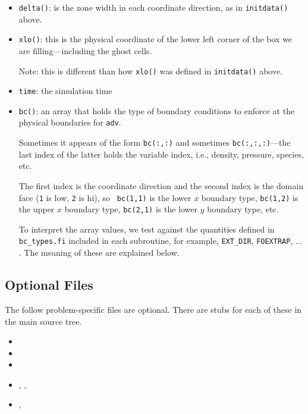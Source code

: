 \begin{itemize}
\begin{itemize}
  \item {\tt delta()}: is the zone width in each coordinate direction,
    as in {\tt initdata()} above.

  \item {\tt xlo()}: this is the physical coordinate of the lower
    left corner of the box we are filling---including the ghost cells.

    Note: this is different than how {\tt xlo()} was defined in
    {\tt initdata()} above.

  \item {\tt time}: the simulation time

  \item {\tt bc()}: an array that holds the type of boundary conditions
    to enforce at the physical boundaries for {\tt adv}.

    Sometimes it appears of the form {\tt bc(:,:)} and sometimes
    {\tt bc(:,:,:)}---the last index of the latter holds the variable
    index, i.e., density, pressure, species, etc.

    The first index is the coordinate direction and the second index
    is the domain face ({\tt 1} is low, {\tt 2} is hi), so {\tt
    bc(1,1)} is the lower $x$ boundary type, {\tt bc(1,2)} is
    the upper $x$ boundary type, {\tt bc(2,1)} is the lower
    $y$ boundary type, etc.

    To interpret the array values, we test against the quantities
    defined in {\tt bc\_types.fi} included in each subroutine,
    for example, {\tt EXT\_DIR}, {\tt FOEXTRAP}, $\ldots$.  The
    meaning of these are explained below.

  \end{itemize}

\end{itemize}


\subsection{Optional Files}

The follow problem-specific files are optional.  There are stubs for
each of these in the main source tree.  

\begin{itemize}

\item {}

\item {}

\item {}

\item {}, , 

\item {}, 

\end{itemize}



